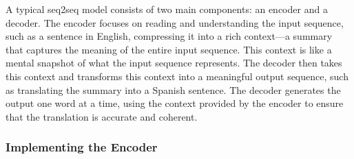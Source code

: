 A typical seq2seq model consists of two main components: an encoder and a decoder. 
The encoder focuses on reading and understanding the input sequence, such as a sentence in English, compressing it into a rich context---a summary that captures the meaning of the entire input sequence. This context is like a mental snapshot of what the input sequence represents.
The decoder then takes this context and transforms this context into a meaningful output sequence, such as translating the summary into a Spanish sentence. The decoder generates the output one word at a time, using the context provided by the encoder to ensure that the translation is accurate and coherent.

\subsubsection{Implementing the Encoder}

